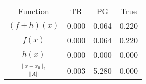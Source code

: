 \begin{tabular}{| c |c |c |c |}
    \hline
    \rowcolor[gray]{0.9}
\multicolumn{4}{|c|}{Minima} \\ \hline Function & TR & PG & True \\
    \hline
  \rowcolor[gray]{0.7}
    $ (f + h)(x) $ & 0.000 & 0.064 & 0.220 \\
  \hline
  \rowcolor[gray]{0.8}
    $ f(x) $ & 0.000 & 0.064 & 0.220 \\
  \hline
  \rowcolor[gray]{0.7}
    $ h(x) $ & 0.000 & 0.000 & 0.000 \\
  \hline
  \rowcolor[gray]{0.8}
    $ \frac{||x - x_0||_2}{||A||} $ & 0.003 & 5.280 & 0.000 \\
  \hline
\end{tabular}
